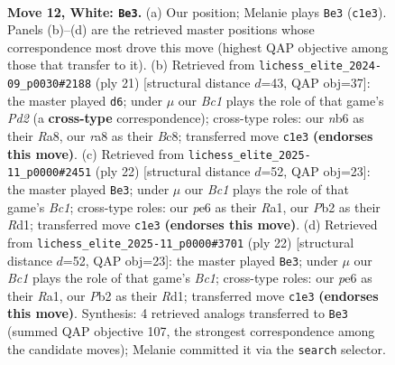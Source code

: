\documentclass[11pt]{article}
\begin{document}
\clearpage

\begin{figure}[p]\centering
\begin{subfigure}{0.46\textwidth}\centering
\resizebox{\linewidth}{!}{%
\newchessgame
\chessboard[
  setfen={r1b1kb1r/1p3ppp/pnn1p3/4P3/8/5NP1/PP3P1P/RNBK1B1R w kq - 0 12},
  showmover=false,
  pgfstyle=straightmove, color=movearrow, markmove={c1-e3}
]}
\caption{}
\end{subfigure}\hfill
\begin{subfigure}{0.46\textwidth}\centering
\resizebox{\linewidth}{!}{%
\newchessgame
\chessboard[
  setfen={r1b1k1nr/2pp1ppp/2p2b2/p7/N3P2P/2P2P2/PP3P2/R1B1KB1R b KQkq - 0 11},
  showmover=false,
  pgfstyle=straightmove, color=movearrow, markmove={d7-d6}
]}
\caption{}
\end{subfigure}
\\[4pt]
\begin{subfigure}{0.46\textwidth}\centering
\resizebox{\linewidth}{!}{%
\newchessgame
\chessboard[
  setfen={r1b1kb1r/ppp2ppp/2p3n1/4P3/8/2N2N1P/PPP2PP1/R1BR2K1 w - - 1 12},
  showmover=false,
  pgfstyle=straightmove, color=movearrow, markmove={c1-e3}
]}
\caption{}
\end{subfigure}\hfill
\begin{subfigure}{0.46\textwidth}\centering
\resizebox{\linewidth}{!}{%
\newchessgame
\chessboard[
  setfen={r1b1kb1r/ppp2ppp/2p3n1/4P3/8/2N2N1P/PPP2PP1/R1BR2K1 w - - 1 12},
  showmover=false,
  pgfstyle=straightmove, color=movearrow, markmove={c1-e3}
]}
\caption{}
\end{subfigure}
\caption{\textbf{Move 12, White: \texttt{Be3}.} (a) Our position; Melanie plays \texttt{Be3} (\texttt{c1e3}). Panels (b)--(d) are the retrieved master positions whose correspondence most drove this move (highest QAP objective among those that transfer to it). (b) Retrieved from \texttt{lichess\_elite\_2024-09\_p0030\#2188} (ply 21) [structural distance $d$=43, QAP obj=37]: the master played \texttt{d6}; under $\mu$ our \emph{Bc1} plays the role of that game's \emph{Pd2} (a \textbf{cross-type} correspondence); cross-type roles: our \emph{n}b6 as their \emph{R}a8, our \emph{r}a8 as their \emph{B}c8; transferred move \texttt{c1e3} \textbf{(endorses this move)}. (c) Retrieved from \texttt{lichess\_elite\_2025-11\_p0000\#2451} (ply 22) [structural distance $d$=52, QAP obj=23]: the master played \texttt{Be3}; under $\mu$ our \emph{Bc1} plays the role of that game's \emph{Bc1}; cross-type roles: our \emph{p}e6 as their \emph{R}a1, our \emph{P}b2 as their \emph{R}d1; transferred move \texttt{c1e3} \textbf{(endorses this move)}. (d) Retrieved from \texttt{lichess\_elite\_2025-11\_p0000\#3701} (ply 22) [structural distance $d$=52, QAP obj=23]: the master played \texttt{Be3}; under $\mu$ our \emph{Bc1} plays the role of that game's \emph{Bc1}; cross-type roles: our \emph{p}e6 as their \emph{R}a1, our \emph{P}b2 as their \emph{R}d1; transferred move \texttt{c1e3} \textbf{(endorses this move)}. Synthesis: 4 retrieved analogs transferred to \texttt{Be3} (summed QAP objective 107, the strongest correspondence among the candidate moves); Melanie committed it via the \texttt{search} selector.}
\label{fig:thought-m22}
\end{figure}
\end{document}
